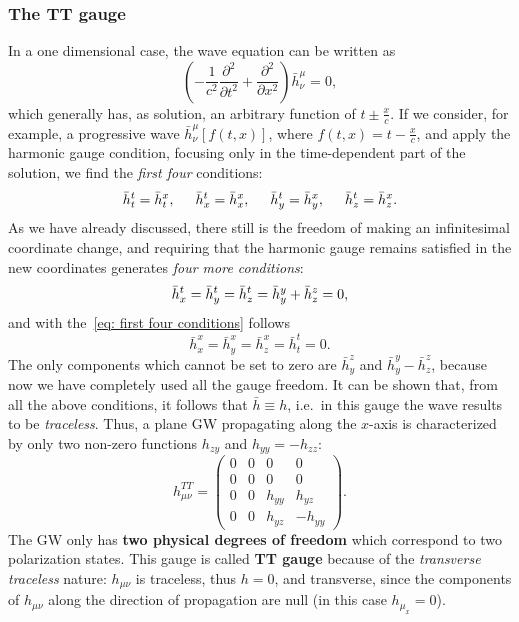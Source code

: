 \subsubsection{The TT gauge}
In a one dimensional case, the wave equation can be written as
\[
    \left( -\frac{1}{c^2} \frac{\partial^2}{\partial t^2}  + \frac{\partial^2}{\partial x^2}\right)\bar{h}^\mu_\nu = 0,
\]
which generally has, as solution, an arbitrary function of $t\pm \frac{x}{c}$.
If we consider, for example, a progressive wave $\bar{h}^\mu_\nu [f(t,x)]$, where $f(t,x) = t- \frac{x}{c}$, and apply the harmonic gauge condition, focusing only in the time-dependent part of the solution, we find the \textit{first four} conditions:
\begin{equation}
    \bar{h}^t_t = \bar{h}^x_t, \hspace{5mm} \bar{h}^t_x = \bar{h}^x_x, \hspace{5mm} \bar{h}^t_y = \bar{h}^x_y, \hspace{5mm} \bar{h}^t_z = \bar{h}^x_z.
    \label{eq: first four conditions}
\end{equation}
As we have already discussed, there still is the freedom of making an infinitesimal coordinate change, and requiring that the harmonic gauge remains satisfied in the new coordinates generates \textit{four more conditions}:
\begin{equation}
    \bar{h}^t_x = \bar{h}^t_y = \bar{h}^t_z = \bar{h}^y_y + \bar{h}^z_z = 0,
    \notag
\end{equation}
and with the~\eqref{eq: first four conditions} follows
\[
     \bar{h}^x_x = \bar{h}^x_y = \bar{h}^x_z = \bar{h}^t_t = 0.
\]
The only components which cannot be set to zero are $\bar{h}^z_y$ and $\bar{h}^y_y - \bar{h}^z_z$, because now we have completely used all the gauge freedom.
It can be shown that, from all the above conditions, it follows that $\bar{h} \equiv h$, i.e.\ in this gauge the wave results to be \textit{traceless}.
Thus, a plane GW propagating along the $x$-axis is characterized by only two non-zero functions $h_{zy}$ and $h_{yy}=-h_{zz}$:
\begin{equation}
    h^{TT}_{\mu\nu} =  
    \begin{pmatrix}
0 & 0 & 0 & 0 \\
0 & 0 & 0 & 0 \\
0 & 0 & h_{yy} & h_{yz} \\
0 & 0 & h_{yz} & -h_{yy}
\end{pmatrix}.
    \label{eq: h as a matrix in x case}
\end{equation}
The GW only has \textbf{two physical degrees of freedom} which correspond to two polarization states.
This gauge is called \textbf{TT gauge} because of the \textit{transverse traceless} nature: $h_{\mu\nu}$ is traceless, thus $h=0$, and transverse, since the components of $h_{\mu\nu}$ along the direction of propagation are null (in this case $h_{\mu_x}=0$).

